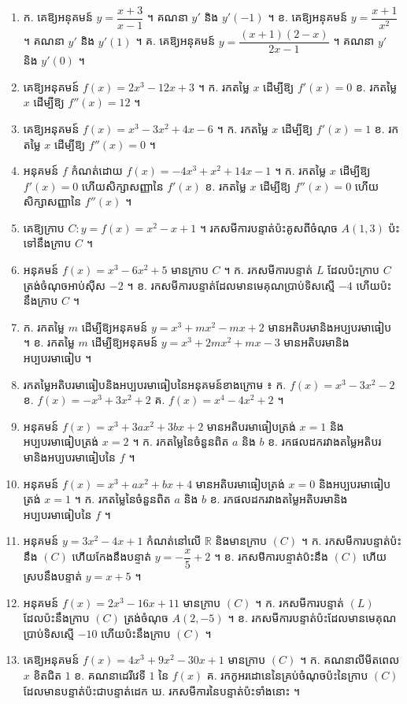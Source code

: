 \begin{enumerate}[1]
  \item ក. គេឱ្យអនុគមន៍ $y = \dfrac{x + 3}{x - 1}$ ។ គណនា $y'$ និង $y'(-1)$ ។ \quad ខ. គេឱ្យអនុគមន៍ $y = \dfrac{x + 1}{x^2}$ ។ គណនា $y'$ និង $y'(1)$ ។ \quad គ. គេឱ្យអនុគមន៍ $y = \dfrac{(x + 1)(2 - x)}{2x - 1}$ ។ គណនា $y'$ និង $y'(0)$ ។
  \item គេឱ្យអនុគមន៍ $f(x) = 2x^3 - 12x + 3$ ។ \quad ក. រកតម្លៃ $x$ ដើម្បីឱ្យ $f'(x) = 0$ \quad ខ. រកតម្លៃ $x$ ដើម្បីឱ្យ $f''(x) = 12$ ។
  \item គេឱ្យអនុគមន៍ $f(x) = x^3 - 3x^2 + 4x - 6$ ។ \quad ក. រកតម្លៃ $x$ ដើម្បីឱ្យ $f'(x) = 1$ \quad ខ. រកតម្លៃ $x$ ដើម្បីឱ្យ $f''(x) = 0$ ។
  \item អនុគមន៍ $f$ កំណត់ដោយ $f(x) = -4x^3 + x^2 + 14x - 1$ ។ \quad ក. រកតម្លៃ $x$ ដើម្បីឱ្យ $f'(x) = 0$ ហើយសិក្សាសញ្ញានៃ $f'(x)$ \quad ខ. រកតម្លៃ $x$ ដើម្បីឱ្យ $f''(x) = 0$ ហើយសិក្សាសញ្ញានៃ $f''(x)$ ។
  \item គេឱ្យក្រាប $C : y = f(x) = x^2 - x + 1$ ។ រកសមីការបន្ទាត់ប៉ះគូសពីចំណុច $A(1, 3)$ ប៉ះទៅនឹងក្រាប $C$ ។
  \item អនុគមន៍ $f(x) = x^3 - 6x^2 + 5$ មានក្រាប $C$ ។ \quad ក. រកសមីការបន្ទាត់ $L$ ដែលប៉ះក្រាប $C$ ត្រង់ចំណុចអាប់ស៊ីស $-2$ ។ \quad ខ. រកសមីការបន្ទាត់ដែលមានមេគុណប្រាប់ទិសស្មើ $-4$ ហើយប៉ះនឹងក្រាប $C$ ។
  \item ក. រកតម្លៃ $m$ ដើម្បីឱ្យអនុគមន៍ $y = x^3 + mx^2 - mx + 2$ មានអតិបរមានិងអប្បបរមាធៀប ។ \quad ខ. រកតម្លៃ $m$ ដើម្បីឱ្យអនុគមន៍ $y = x^3 + 2mx^2 + mx - 3$ មានអតិបរមានិងអប្បបរមាធៀប ។
  \item រកតម្លៃអតិបរមាធៀបនិងអប្បបរមាធៀបនៃអនុគមន៍ខាងក្រោម ៖ \quad ក. $f(x) = x^3 - 3x^2 - 2$ \quad ខ. $f(x) = -x^3 + 3x^2 + 2$ \quad គ. $f(x) = x^4 - 4x^2 + 2$ ។
  \item អនុគមន៍ $f(x) = x^3 + 3ax^2 + 3bx + 2$ មានអតិបរមាធៀបត្រង់ $x = 1$ និងអប្បបរមាធៀបត្រង់ $x = 2$ ។ \quad ក. រកតម្លៃនៃចំនួនពិត $a$ និង $b$ \quad ខ. រកផលដករវាងតម្លៃអតិបរមានិងអប្បបរមាធៀបនៃ $f$ ។
  \item អនុគមន៍ $f(x) = x^3 + ax^2 + bx + 4$ មានអតិបរមាធៀបត្រង់ $x = 0$ និងអប្បបរមាធៀបត្រង់ $x = 1$ ។ \quad ក. រកតម្លៃនៃចំនួនពិត $a$ និង $b$ \quad ខ. រកផលដករវាងតម្លៃអតិបរមានិងអប្បបរមាធៀបនៃ $f$ ។
  \item អនុគមន៍ $y = 3x^2 - 4x + 1$ កំណត់នៅលើ $\mathbb{R}$ និងមានក្រាប $(C)$ ។ \quad ក. រកសមីការបន្ទាត់ប៉ះនឹង $(C)$ ហើយកែងនឹងបន្ទាត់ $y = -\dfrac{x}{5} + 2$ ។ \quad ខ. រកសមីការបន្ទាត់ប៉ះនឹង $(C)$ ហើយស្របនឹងបន្ទាត់ $y = x + 5$ ។
  \item អនុគមន៍ $f(x) = 2x^3 - 16x + 11$ មានក្រាប $(C)$ ។ \quad ក. រកសមីការបន្ទាត់ $(L)$ ដែលប៉ះនឹងក្រាប $(C)$ ត្រង់ចំណុច $A(2, -5)$ ។ \quad ខ. រកសមីការបន្ទាត់ប៉ះដែលមានមេគុណប្រាប់ទិសស្មើ $-10$ ហើយប៉ះនឹងក្រាប $(C)$ ។
  \item គេឱ្យអនុគមន៍ $f(x) = 4x^3 + 9x^2 - 30x + 1$ មានក្រាប $(C)$ ។ \quad ក. គណនាលីមីតពេល $x$ ខិតជិត $1$ \quad ខ. គណនាដេរីវេទី $1$ នៃ $f(x)$ \quad គ. រកកូអរដោនេនៃគ្រប់ចំណុចប៉ះនៃក្រាប $(C)$ ដែលមានបន្ទាត់ប៉ះជាបន្ទាត់ដេក \quad ឃ. រកសមីការនៃបន្ទាត់ប៉ះទាំងនោះ ។
\end{enumerate}

